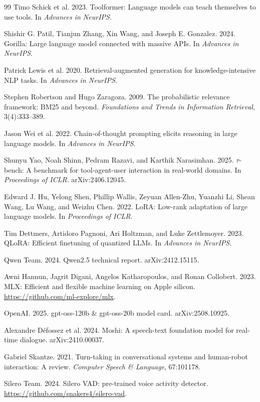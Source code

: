 \documentclass[11pt,a4paper]{article}
\begin{document}
\begin{thebibliography}{99}
 Timo Schick et al. 2023. Toolformer: Language models can teach themselves to use tools. In
\emph{Advances in NeurIPS}.

 Shishir G. Patil, Tianjun Zhang, Xin Wang, and Joseph E. Gonzalez. 2024. Gorilla: Large language
model connected with massive APIs. In \emph{Advances in NeurIPS}.

 Patrick Lewis et al. 2020. Retrieval-augmented generation for knowledge-intensive NLP tasks. In
\emph{Advances in NeurIPS}.

 Stephen Robertson and Hugo Zaragoza. 2009. The probabilistic relevance framework: BM25 and beyond.
\emph{Foundations and Trends in Information Retrieval}, 3(4):333--389.

 Jason Wei et al. 2022. Chain-of-thought prompting elicits reasoning in large language models. In
\emph{Advances in NeurIPS}.

 Shunyu Yao, Noah Shinn, Pedram Razavi, and Karthik Narasimhan. 2025. $\tau$-bench: A benchmark for
tool-agent-user interaction in real-world domains. In \emph{Proceedings of ICLR}. arXiv:2406.12045.

 Edward J. Hu, Yelong Shen, Phillip Wallis, Zeyuan Allen-Zhu, Yuanzhi Li, Shean Wang, Lu Wang, and
Weizhu Chen. 2022. LoRA: Low-rank adaptation of large language models. In \emph{Proceedings of ICLR}.

 Tim Dettmers, Artidoro Pagnoni, Ari Holtzman, and Luke Zettlemoyer. 2023. QLoRA: Efficient
finetuning of quantized LLMs. In \emph{Advances in NeurIPS}.

 Qwen Team. 2024. Qwen2.5 technical report. arXiv:2412.15115.

 Awni Hannun, Jagrit Digani, Angelos Katharopoulos, and Ronan Collobert. 2023. MLX: Efficient and
flexible machine learning on Apple silicon. \url{https://github.com/ml-explore/mlx}.

 OpenAI. 2025. gpt-oss-120b \& gpt-oss-20b model card. arXiv:2508.10925.

 Alexandre D{\'e}fossez et al. 2024. Moshi: A speech-text foundation model for real-time dialogue.
arXiv:2410.00037.

 Gabriel Skantze. 2021. Turn-taking in conversational systems and human-robot interaction: A review.
\emph{Computer Speech \& Language}, 67:101178.

 Silero Team. 2024. Silero VAD: pre-trained voice activity detector.
\url{https://github.com/snakers4/silero-vad}.


\end{thebibliography}
\end{document}
